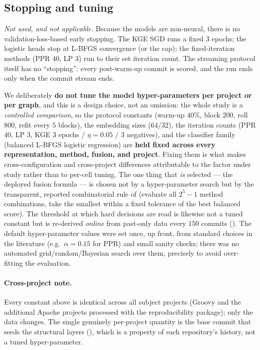 	\subsection{Stopping and tuning}
	\label{sec:setup-stopping}
	\begin{description}[leftmargin=1.4em]
		\item[Early-stopping criteria.] \emph{Not used, and not applicable.} Because the
		models are non-neural, there is no validation-loss-based early stopping. The KGE
		SGD runs a fixed $3$ epochs; the logistic heads stop at L-BFGS convergence (or the
		 cap); the fixed-iteration methods (PPR $40$, LP $3$) run to their
		set iteration count. The streaming protocol itself has no ``stopping'': every
		post-warm-up commit is scored, and the run ends only when the commit stream ends.
		\item[Hyper-parameter tuning strategy.] We deliberately \textbf{do not tune the
		model hyper-parameters per project or per graph}, and this is a design choice, not
		an omission: the whole study is a \emph{controlled comparison}, so the protocol
		constants (warm-up $40\%$, block $200$, roll $800$, refit every $5$ blocks), the
		embedding sizes ($64$/$32$), the iteration counts (PPR $40$, LP $3$, KGE
		$3$ epochs / $\eta=0.05$ / $3$ negatives), and the classifier family (balanced L-BFGS
		logistic regression) are \textbf{held fixed across every representation, method,
		fusion, and project}. Fixing them is what makes cross-configuration and
		cross-project differences attributable to the factor under study rather than to
		per-cell tuning. The one thing that \emph{is} selected --- the deployed fusion
		formula --- is chosen not by a hyper-parameter search but by the transparent,
		reported combinatorial rule of  (evaluate all
		$2^5-1$ method combinations, take the smallest within a fixed tolerance of the best
		balanced score). The threshold at which hard decisions are read is likewise not a
		tuned constant but is re-derived \emph{online} from past-only data every $150$
		commits (). The default hyper-parameter values were set
		once, up front, from standard choices in the literature (e.g.\ $\alpha=0.15$ for
		PPR) and small sanity checks; there was no automated grid/random/Bayesian search
		over them, precisely to avoid over-fitting the evaluation.
	\end{description}

	\paragraph{Cross-project note.} Every constant above is identical across all subject
	projects (Groovy and the additional Apache projects processed with the reproducibility
	package); only the data changes. The single genuinely per-project quantity is the base
	commit that seeds the structural layers (), which is a property
	of each repository's history, not a tuned hyper-parameter.

